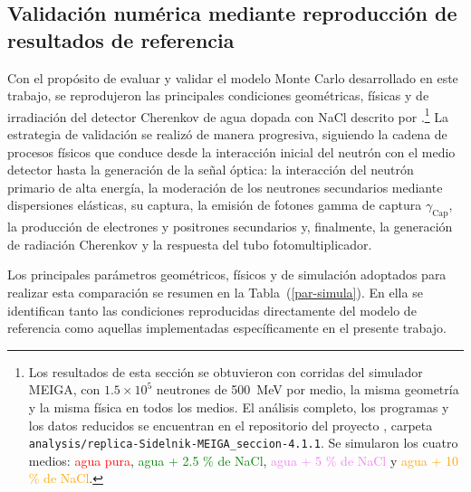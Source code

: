 \subsection{Validación numérica mediante reproducción de resultados de referencia}
\label{sec:Res-WCD-500MeV}

\noindent Con el propósito de evaluar y validar el modelo Monte Carlo desarrollado en este trabajo, se reprodujeron las principales condiciones geométricas, físicas y de irradiación del detector Cherenkov de agua dopada con NaCl descrito por \citet[Sec.~2, pp.~2217--2218, Fig.~1]{Sidelnik2020}.\footnote{Los resultados de esta sección se obtuvieron con corridas del simulador MEIGA, con $1.5\times10^{5}$ neutrones de 500~MeV por medio, la misma geometría y la misma física en todos los medios. El análisis completo, los programas y los datos reducidos se encuentran en el repositorio del proyecto \citep{Betancourt2026WCDNaCl}, carpeta \texttt{analysis/replica-Sidelnik-MEIGA\_seccion-4.1.1}. Se simularon los cuatro medios: \textcolor{red}{agua pura}, \textcolor{green}{agua + 2.5 \% de NaCl}, \textcolor{violet}{agua + 5 \% de NaCl} y \textcolor{orange}{agua + 10 \% de NaCl}.} La estrategia de validación se realizó de manera progresiva, siguiendo la cadena de procesos físicos que conduce desde la interacción inicial del neutrón con el medio detector hasta la generación de la señal óptica: la interacción del neutrón primario de alta energía, la moderación de los neutrones secundarios mediante dispersiones elásticas, su captura, la emisión de fotones gamma de captura $\gamma_{\mathrm{Cap}}$, la producción de electrones y positrones secundarios y, finalmente, la generación de radiación Cherenkov y la respuesta del tubo fotomultiplicador.

Los principales parámetros geométricos, físicos y de simulación adoptados para realizar esta comparación se resumen en la Tabla~(\ref{par-simula}). En ella se identifican tanto las condiciones reproducidas directamente del modelo de referencia como aquellas implementadas específicamente en el presente trabajo.

